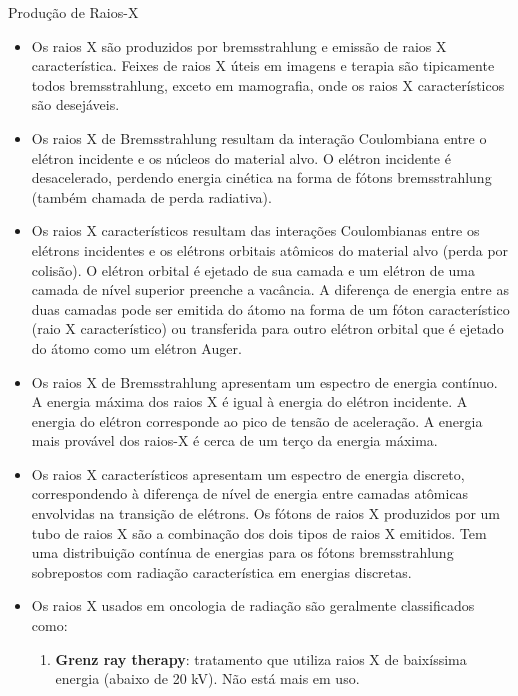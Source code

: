\documentclass[11pt,a4paper]{article}
\newcounter{exemplo}
\begin{document}
\begin{exemplo}

	\textcolor{CarnationPink}{Produção de Raios-X}
    \begin{itemize}
        \item Os raios X são produzidos por bremsstrahlung e emissão de raios X característica. Feixes de raios X úteis em imagens e terapia são tipicamente todos bremsstrahlung, exceto em mamografia, onde os raios X característicos são desejáveis.
        
		\item Os raios X de Bremsstrahlung resultam da interação Coulombiana entre o elétron incidente e os núcleos do material alvo. O elétron incidente é desacelerado, perdendo energia cinética na forma de fótons bremsstrahlung (também chamada de perda radiativa).
		
		\item Os raios X característicos resultam das interações Coulombianas entre os elétrons incidentes e os elétrons orbitais atômicos do material alvo (perda por colisão). O elétron orbital é ejetado de sua camada e um elétron de uma camada de nível superior preenche a vacância. A diferença de energia entre as duas camadas pode ser emitida do átomo na forma de um fóton característico (raio X característico) ou transferida para outro elétron orbital que é ejetado do átomo como um elétron Auger.
		
		\item Os raios X de Bremsstrahlung apresentam um espectro de energia contínuo. A energia máxima dos raios X é igual à energia do elétron incidente. A energia do elétron corresponde ao pico de tensão de aceleração. A energia mais provável dos raios-X é cerca de um terço da energia máxima. 
		
		\item Os raios X característicos apresentam um espectro de energia discreto, correspondendo à diferença de nível de energia entre camadas atômicas envolvidas na transição de elétrons. Os fótons de raios X produzidos por um tubo de raios X são a combinação dos dois tipos de raios X emitidos. Tem uma distribuição contínua de energias para os fótons bremsstrahlung sobrepostos com radiação característica em energias discretas.
		
		\item Os raios X usados em oncologia de radiação são geralmente classificados como:
		
			\begin{enumerate}[label=\alph*)]
				\item \textbf{Grenz ray therapy}: tratamento que utiliza raios X de baixíssima energia (abaixo de 20 kV). Não está mais em uso.
				

\end{enumerate}
\end{itemize}
\end{exemplo}
\end{document}
